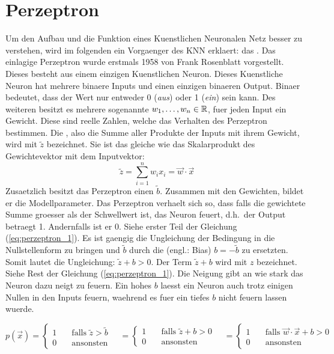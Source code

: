 \section{Perzeptron}
Um den Aufbau und die Funktion eines Kuenstlichen Neuronalen Netz besser zu
verstehen, wird im folgenden ein Vorgaenger des KNN erklaert: das .
\para{}
Das einlagige Perzeptron wurde erstmals 1958 von Frank Rosenblatt vorgestellt. Dieses
besteht aus einem einzigen Kuenstlichen Neuron. Dieses Kuenstliche Neuron
hat mehrere binaere Inputs und einen einzigen binaeren Output. Binaer
bedeutet, dass der Wert nur entweder 0 (\textit{aus}) oder 1 (\textit{ein}) sein
kann. Des weiteren besitzt es mehrere sogenannte  $w_1, \ldots,
w_n \in \mathbb{R}$, fuer jeden Input ein Gewicht.
Diese sind reelle Zahlen, welche das Verhalten des Perzeptron bestimmen.
Die , also die Summe aller Produkte der Inputs mit
ihrem Gewicht, wird mit $\tilde{z}$ bezeichnet.
Sie ist das gleiche wie das Skalarprodukt des Gewichtevektor mit dem Inputvektor:
\begin{equation*}
  \tilde{z} = \sum_{i=1}^{n} w_i x_i = \vec{w} \cdot \vec{x}
\end{equation*}
\para{}
Zusaetzlich besitzt das Perzeptron einen  $\tilde{b}$.
Zusammen mit den Gewichten, bildet er die Modellparameter.
Das Perzeptron verhaelt sich so, dass falls die gewichtete Summe groesser als der
Schwellwert ist, das Neuron feuert, d.h.\ der Output betraegt 1. Andernfalls ist er 0.
Siehe erster Teil der Gleichung (\ref{eq:perzeptron_1}).
Es ist gaengig die Ungleichung der Bedingung in die Nullstellenform zu bringen
und $\tilde{b}$ durch die  (engl.: Bias)
$b = -\tilde{b}$ zu ersetzten. Somit lautet die Ungleichung: $\tilde{z} + b
> 0$. Der Term $\tilde{z} + b$ wird mit $z$ bezeichnet. Siehe Rest der Gleichung (\ref{eq:perzeptron_1}).
Die Neigung gibt an wie stark das Neuron dazu neigt zu feuern. Ein hohes $b$
laesst ein Neuron auch trotz einigen Nullen in den Inputs feuern, waehrend es
fuer ein tiefes $b$ nicht feuern lassen wuerde.

\begin{equation}\label{eq:perzeptron_1}
  p(\vec{x}) =
  \begin{cases}
    1 & \quad \text{falls } \tilde{z} > \tilde{b}\\
    0 & \quad \text{ansonsten}
  \end{cases}
  \quad =
  \begin{cases}
    1 & \quad \text{falls } \tilde{z} + b > 0\\
    0 & \quad \text{ansonsten}
  \end{cases}
  \quad =
  \begin{cases}
    1 & \quad\text{falls } \vec{w} \cdot \vec{x} + b > 0\\
    0 & \quad\text{ansonsten}
  \end{cases}
\end{equation}

